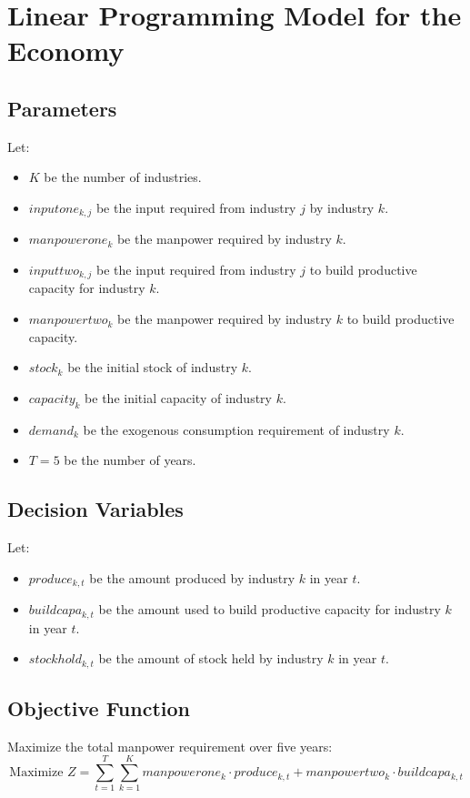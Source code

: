 \documentclass{article}
\begin{document}
\section*{Linear Programming Model for the Economy}

\subsection*{Parameters}
Let:
\begin{itemize}
    \item \( K \) be the number of industries.
    \item \( inputone_{k, j} \) be the input required from industry \( j \) by industry \( k \).
    \item \( manpowerone_k \) be the manpower required by industry \( k \).
    \item \( inputtwo_{k, j} \) be the input required from industry \( j \) to build productive capacity for industry \( k \).
    \item \( manpowertwo_k \) be the manpower required by industry \( k \) to build productive capacity.
    \item \( stock_k \) be the initial stock of industry \( k \).
    \item \( capacity_k \) be the initial capacity of industry \( k \).
    \item \( demand_k \) be the exogenous consumption requirement of industry \( k \).
    \item \( T = 5 \) be the number of years.
\end{itemize}

\subsection*{Decision Variables}
Let:
\begin{itemize}
    \item \( produce_{k, t} \) be the amount produced by industry \( k \) in year \( t \).
    \item \( buildcapa_{k, t} \) be the amount used to build productive capacity for industry \( k \) in year \( t \).
    \item \( stockhold_{k, t} \) be the amount of stock held by industry \( k \) in year \( t \).
\end{itemize}

\subsection*{Objective Function}
Maximize the total manpower requirement over five years:
\[
\text{Maximize } Z = \sum_{t=1}^{T} \sum_{k=1}^{K} manpowerone_k \cdot produce_{k, t} + manpowertwo_k \cdot buildcapa_{k, t}
\]
\end{document}

